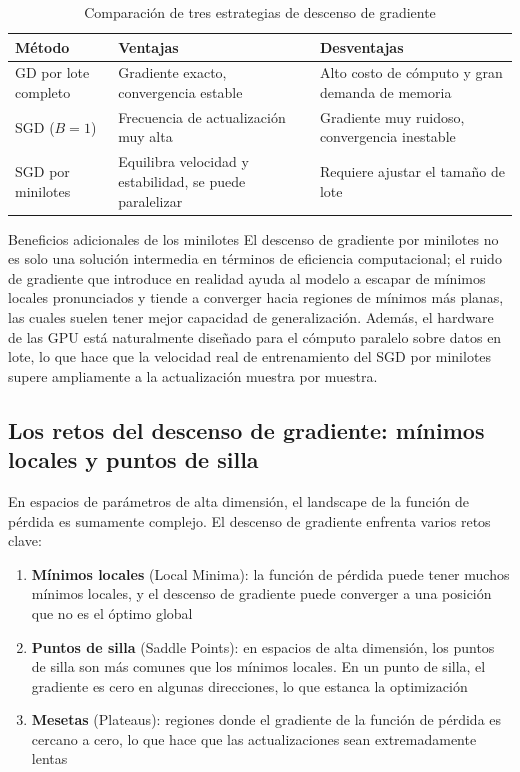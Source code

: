 \documentclass[a4paper]{article}
\begin{document}
\begin{table}[H]
\centering
\begin{tabular}{lp{4.5cm}p{4.5cm}}
\toprule
\textbf{Método} & \textbf{Ventajas} & \textbf{Desventajas} \\
\midrule
GD por lote completo & Gradiente exacto, convergencia estable & Alto costo de cómputo y gran demanda de memoria \\
SGD ($B=1$) & Frecuencia de actualización muy alta & Gradiente muy ruidoso, convergencia inestable \\
SGD por minilotes & Equilibra velocidad y estabilidad, se puede paralelizar & Requiere ajustar el tamaño de lote \\
\bottomrule
\end{tabular}
\caption{Comparación de tres estrategias de descenso de gradiente}
\end{table}

\begin{knowledgebox}{Beneficios adicionales de los minilotes}
El descenso de gradiente por minilotes no es solo una solución intermedia en términos de eficiencia computacional; el ruido de gradiente que introduce en realidad ayuda al modelo a escapar de mínimos locales pronunciados y tiende a converger hacia regiones de mínimos más planas, las cuales suelen tener mejor capacidad de generalización. Además, el hardware de las GPU está naturalmente diseñado para el cómputo paralelo sobre datos en lote, lo que hace que la velocidad real de entrenamiento del SGD por minilotes supere ampliamente a la actualización muestra por muestra.
\end{knowledgebox}

\subsection{Los retos del descenso de gradiente: mínimos locales y puntos de silla}

En espacios de parámetros de alta dimensión, el landscape de la función de pérdida es sumamente complejo. El descenso de gradiente enfrenta varios retos clave:

\begin{enumerate}
\item \textbf{Mínimos locales} (Local Minima): la función de pérdida puede tener muchos mínimos locales, y el descenso de gradiente puede converger a una posición que no es el óptimo global
\item \textbf{Puntos de silla} (Saddle Points): en espacios de alta dimensión, los puntos de silla son más comunes que los mínimos locales. En un punto de silla, el gradiente es cero en algunas direcciones, lo que estanca la optimización
\item \textbf{Mesetas} (Plateaus): regiones donde el gradiente de la función de pérdida es cercano a cero, lo que hace que las actualizaciones sean extremadamente lentas
\end{enumerate}
\end{document}
